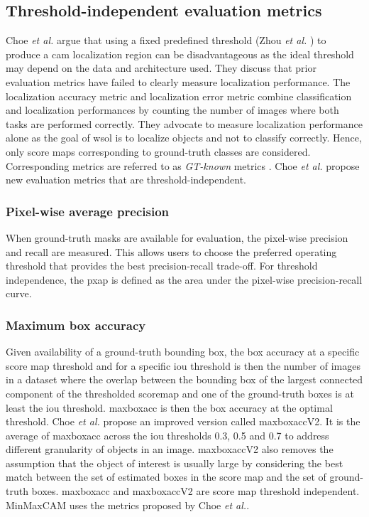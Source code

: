 \subsection{Threshold-independent evaluation metrics}
Choe \textit{et al.} \cite{choe2020evaluating} argue that using a fixed predefined threshold (Zhou \textit{et al.} \cite{zhou2016cvpr}) to produce a \acrshort{cam} localization region can be disadvantageous as the ideal threshold may depend on the data and architecture used. They discuss that prior evaluation metrics have failed to clearly measure localization performance. The localization accuracy metric \cite{russakovsky2015imagenet} and localization error \cite{zhou2016cvpr, selvaraju2017grad} metric combine classification and localization performances by counting the number of images where both tasks are performed correctly. They advocate to measure localization performance alone as the goal of \acrshort{wsol} is to localize objects and not to classify correctly. Hence, only score maps corresponding to ground-truth classes are considered. Corresponding metrics are referred to as \textit{GT-known} metrics \cite{choe2019attention, singh2017hide, zhang2018adversarial, zhang2018self}. Choe \textit{et al.} propose new evaluation metrics that are threshold-independent.

\subsubsection{Pixel-wise average precision}
When ground-truth masks are available for evaluation, the pixel-wise precision and recall \cite{achanta2009frequency} are measured. This allows users to choose the preferred operating threshold that provides the best precision-recall trade-off. For threshold independence, the \acrfull{pxap} is defined as the area under the pixel-wise precision-recall curve.

\subsubsection{Maximum box accuracy}
Given availability of a ground-truth bounding box, the box accuracy at a specific score map threshold and for a specific \acrshort{iou} threshold is then the number of images in a dataset where the overlap  between the bounding box of the largest connected component of the thresholded scoremap and one of the ground-truth boxes is at least the \acrshort{iou} threshold. \acrshort{maxboxacc} is then the box accuracy at the optimal threshold. Choe \textit{et al.} propose an improved version called \acrshort{maxboxacc}V2. It is the average of \acrshort{maxboxacc} across the \acrshort{iou} thresholds 0.3, 0.5 and 0.7 to address different granularity of objects in an image. \acrshort{maxboxacc}V2 also removes the assumption that the object of interest is usually large by considering the best match between the set of estimated boxes in the score map and the set of ground-truth boxes. \acrshort{maxboxacc} and \acrshort{maxboxacc}V2 are score map threshold independent. MinMaxCAM \cite{wang2021minmaxcam} uses the metrics proposed by Choe \textit{et al.}.

